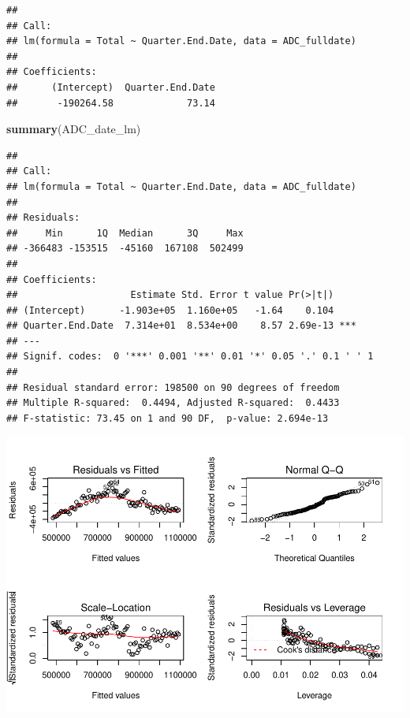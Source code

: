\documentclass[12pt,]{article}
\newenvironment{Shaded}{\begin{snugshade}}{\end{snugshade}}
\newcommand{\KeywordTok}[1]{\textcolor[rgb]{0.13,0.29,0.53}{\textbf{#1}}}
\newcommand{\DataTypeTok}[1]{\textcolor[rgb]{0.13,0.29,0.53}{#1}}
\newcommand{\DecValTok}[1]{\textcolor[rgb]{0.00,0.00,0.81}{#1}}
\newcommand{\CommentTok}[1]{\textcolor[rgb]{0.56,0.35,0.01}{\textit{#1}}}
\newcommand{\NormalTok}[1]{#1}
\begin{document}
\begin{verbatim}
## 
## Call:
## lm(formula = Total ~ Quarter.End.Date, data = ADC_fulldate)
## 
## Coefficients:
##      (Intercept)  Quarter.End.Date  
##       -190264.58             73.14
\end{verbatim}

\begin{Shaded}
\begin{Highlighting}[]
\KeywordTok{summary}\NormalTok{(ADC_date_lm) }
\end{Highlighting}
\end{Shaded}

\begin{verbatim}
## 
## Call:
## lm(formula = Total ~ Quarter.End.Date, data = ADC_fulldate)
## 
## Residuals:
##     Min      1Q  Median      3Q     Max 
## -366483 -153515  -45160  167108  502499 
## 
## Coefficients:
##                    Estimate Std. Error t value Pr(>|t|)    
## (Intercept)      -1.903e+05  1.160e+05   -1.64    0.104    
## Quarter.End.Date  7.314e+01  8.534e+00    8.57 2.69e-13 ***
## ---
## Signif. codes:  0 '***' 0.001 '**' 0.01 '*' 0.05 '.' 0.1 ' ' 1
## 
## Residual standard error: 198500 on 90 degrees of freedom
## Multiple R-squared:  0.4494, Adjusted R-squared:  0.4433 
## F-statistic: 73.45 on 1 and 90 DF,  p-value: 2.694e-13
\end{verbatim}

\begin{Shaded}
\end{Shaded}

\includegraphics{SKo_Project_Template_files/figure-latex/Test2_1-2.pdf}
\end{document}
